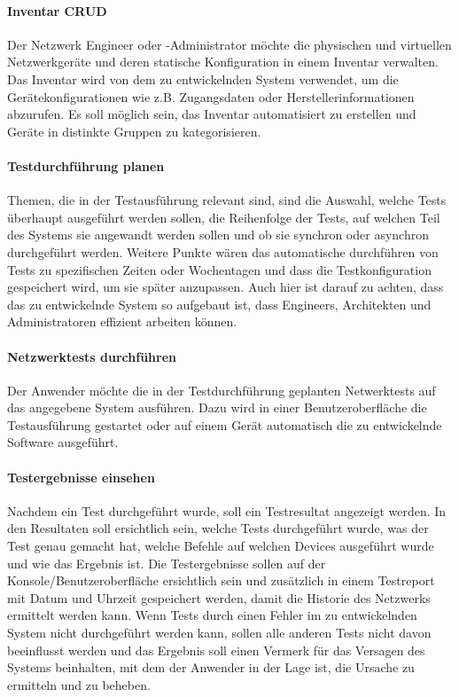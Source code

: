 \documentclass[]{subfiles}
\begin{document}
        \paragraph{Inventar CRUD}
        Der Netzwerk Engineer oder -Administrator möchte die physischen und virtuellen 
        Netzwerkgeräte und deren statische Konfiguration in einem Inventar verwalten.
        Das Inventar wird von dem zu entwickelnden System verwendet, um die 
        Gerätekonfigurationen wie z.B. Zugangsdaten oder Herstellerinformationen abzurufen.
        Es soll möglich sein, das Inventar automatisiert zu erstellen und Geräte in distinkte
        Gruppen zu kategorisieren. 

        \paragraph{Testdurchführung planen}
        Themen, die in der Testausführung relevant sind, sind die Auswahl, 
        welche Tests überhaupt ausgeführt werden sollen, die Reihenfolge der Tests, 
        auf welchen Teil des Systems sie angewandt werden sollen 
        und ob sie synchron oder asynchron durchgeführt werden. 
        Weitere Punkte wären das automatische durchführen von Tests zu spezifischen 
        Zeiten oder Wochentagen und dass die Testkonfiguration gespeichert wird, 
        um sie später anzupassen. 
        Auch hier ist darauf zu achten, dass das zu entwickelnde System so aufgebaut ist, 
        dass Engineers, Architekten und Administratoren effizient arbeiten können.

        \paragraph{Netzwerktests durchführen}
        Der Anwender möchte die in der Testdurchführung geplanten Netwerktests auf das
        angegebene System ausführen. 
        Dazu wird in einer Benutzeroberfläche die Testausführung gestartet oder auf
        einem Gerät automatisch die zu entwickelnde Software ausgeführt.

        \paragraph{Testergebnisse einsehen}
        Nachdem ein Test durchgeführt wurde, soll ein Testresultat angezeigt werden. 
        In den Resultaten soll ersichtlich sein, welche Tests durchgeführt wurde, 
        was der Test genau gemacht hat, welche Befehle auf welchen Devices ausgeführt 
        wurde und wie das Ergebnis ist. 
        Die Testergebnisse sollen auf der Konsole/Benutzeroberfläche ersichtlich sein 
        und zusätzlich in einem Testreport mit Datum und Uhrzeit gespeichert werden, 
        damit die Historie des Netzwerks ermittelt werden kann. 
        Wenn Tests durch einen Fehler im zu entwickelnden System nicht durchgeführt 
        werden kann, sollen alle anderen Tests nicht davon beeinflusst werden und 
        das Ergebnis soll einen Vermerk für das Versagen des Systems beinhalten,
        mit dem der Anwender in der Lage ist, die Ursache zu ermitteln und zu beheben.
\end{document}
